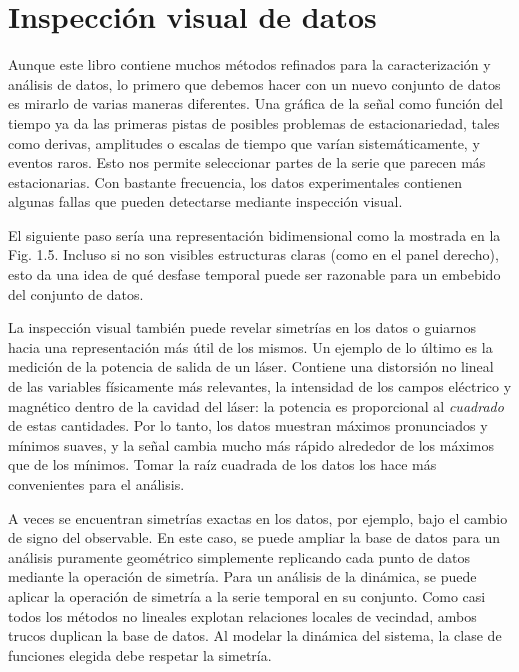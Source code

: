\documentclass[10pt,a4paper]{book}
\begin{document}
\newpage

\section{Inspección visual de datos}

Aunque este libro contiene muchos métodos refinados para la caracterización y análisis de datos, lo primero que debemos hacer con un nuevo conjunto de datos es mirarlo de varias maneras diferentes. Una gráfica de la señal como función del tiempo ya da las primeras pistas de posibles problemas de estacionariedad, tales como derivas, amplitudes o escalas de tiempo que varían sistemáticamente, y eventos raros. Esto nos permite seleccionar partes de la serie que parecen más estacionarias. Con bastante frecuencia, los datos experimentales contienen algunas fallas que pueden detectarse mediante inspección visual.

El siguiente paso sería una representación bidimensional como la mostrada en la Fig. 1.5. Incluso si no son visibles estructuras claras (como en el panel derecho), esto da una idea de qué desfase temporal puede ser razonable para un embebido del conjunto de datos.

\bigskip

La inspección visual también puede revelar simetrías en los datos o guiarnos hacia una representación más útil de los mismos. Un ejemplo de lo último es la medición de la potencia de salida de un láser. Contiene una distorsión no lineal de las variables físicamente más relevantes, la intensidad de los campos eléctrico y magnético dentro de la cavidad del láser: la potencia es proporcional al \textit{cuadrado} de estas cantidades. Por lo tanto, los datos muestran máximos pronunciados y mínimos suaves, y la señal cambia mucho más rápido alrededor de los máximos que de los mínimos. Tomar la raíz cuadrada de los datos los hace más convenientes para el análisis.

A veces se encuentran simetrías exactas en los datos, por ejemplo, bajo el cambio de signo del observable. En este caso, se puede ampliar la base de datos para un análisis puramente geométrico simplemente replicando cada punto de datos mediante la operación de simetría. Para un análisis de la dinámica, se puede aplicar la operación de simetría a la serie temporal en su conjunto. Como casi todos los métodos no lineales explotan relaciones locales de vecindad, ambos trucos duplican la base de datos. Al modelar la dinámica del sistema, la clase de funciones elegida debe respetar la simetría.
\end{document}
